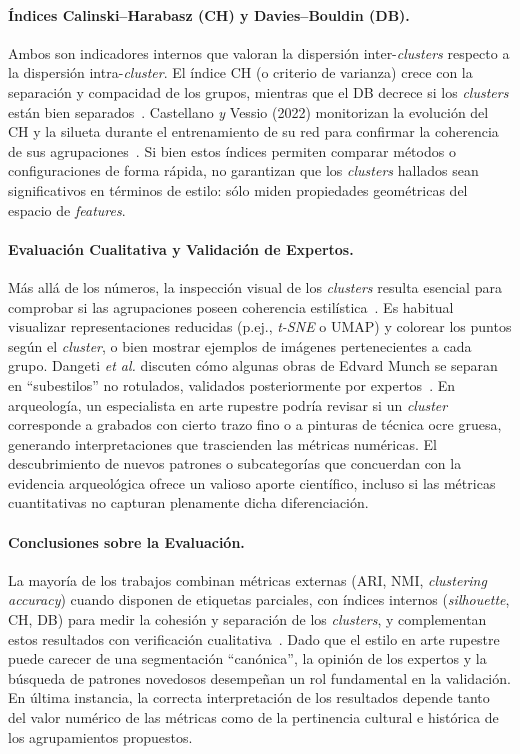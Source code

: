 \paragraph{Índices Calinski–Harabasz (CH) y Davies–Bouldin (DB).}
Ambos son indicadores internos que valoran la dispersión inter-\textit{clusters} respecto a la dispersión intra-\textit{cluster}.
El índice CH (o criterio de varianza) crece con la separación y compacidad de los grupos, mientras que el DB decrece si los \textit{clusters} están bien separados~\cite{dangeti2024}.
Castellano \textit{y} Vessio (2022) monitorizan la evolución del CH y la silueta durante el entrenamiento de su red para confirmar la coherencia de sus agrupaciones~\cite{castellano2022}.
Si bien estos índices permiten comparar métodos o configuraciones de forma rápida, no garantizan que los \textit{clusters} hallados sean significativos en términos de estilo: sólo miden propiedades geométricas del espacio de \textit{features}.

\paragraph{Evaluación Cualitativa y Validación de Expertos.}
Más allá de los números, la inspección visual de los \textit{clusters} resulta esencial para comprobar si las agrupaciones poseen coherencia estilística~\cite{gultepe2018}.
Es habitual visualizar representaciones reducidas (p.ej., \textit{t-SNE} o UMAP) y colorear los puntos según el \textit{cluster}, o bien mostrar ejemplos de imágenes pertenecientes a cada grupo.
Dangeti \textit{et al.} discuten cómo algunas obras de Edvard Munch se separan en “subestilos” no rotulados, validados posteriormente por expertos~\cite{dangeti2024}.
En arqueología, un especialista en arte rupestre podría revisar si un \textit{cluster} corresponde a grabados con cierto trazo fino o a pinturas de técnica ocre gruesa, generando interpretaciones que trascienden las métricas numéricas.
El descubrimiento de nuevos patrones o subcategorías que concuerdan con la evidencia arqueológica ofrece un valioso aporte científico, incluso si las métricas cuantitativas no capturan plenamente dicha diferenciación.

\paragraph{Conclusiones sobre la Evaluación.}
La mayoría de los trabajos combinan métricas externas (ARI, NMI, \textit{clustering accuracy}) cuando disponen de etiquetas parciales, con índices internos (\textit{silhouette}, CH, DB) para medir la cohesión y separación de los \textit{clusters}, y complementan estos resultados con verificación cualitativa~\cite{guerin2018,dangeti2024}.
Dado que el estilo en arte rupestre puede carecer de una segmentación “canónica”, la opinión de los expertos y la búsqueda de patrones novedosos desempeñan un rol fundamental en la validación.
En última instancia, la correcta interpretación de los resultados depende tanto del valor numérico de las métricas como de la pertinencia cultural e histórica de los agrupamientos propuestos.

